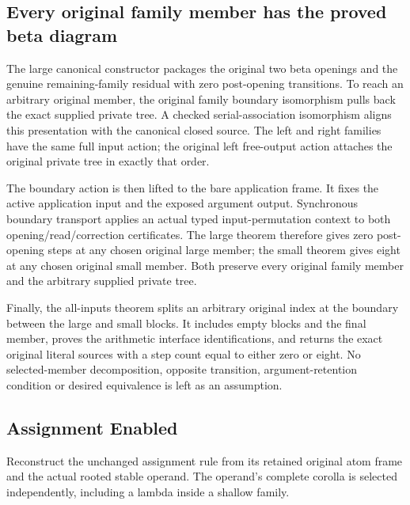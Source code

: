 \subsection{Every original family member has the proved beta diagram}
The large canonical constructor packages the original two beta openings and the genuine remaining-family residual with zero post-opening transitions. To reach an arbitrary original member, the original family boundary isomorphism pulls back the exact supplied private tree. A checked serial-association isomorphism aligns this presentation with the canonical closed source. The left and right families have the same full input action; the original left free-output action attaches the original private tree in exactly that order.

The boundary action is then lifted to the bare application frame. It fixes the active application input and the exposed argument output. Synchronous boundary transport applies an actual typed input-permutation context to both opening/read/correction certificates. The large theorem therefore gives zero post-opening steps at any chosen original large member; the small theorem gives eight at any chosen original small member. Both preserve every original family member and the arbitrary supplied private tree.

Finally, the all-inputs theorem splits an arbitrary original index at the boundary between the large and small blocks. It includes empty blocks and the final member, proves the arithmetic interface identifications, and returns the exact original literal sources with a step count equal to either zero or eight. No selected-member decomposition, opposite transition, argument-retention condition or desired equivalence is left as an assumption.
\par{}

\subsection{Assignment Enabled}
Reconstruct the unchanged assignment rule from its retained original
atom frame and the actual rooted stable operand. The operand's complete
corolla is selected independently, including a lambda inside a shallow family.

